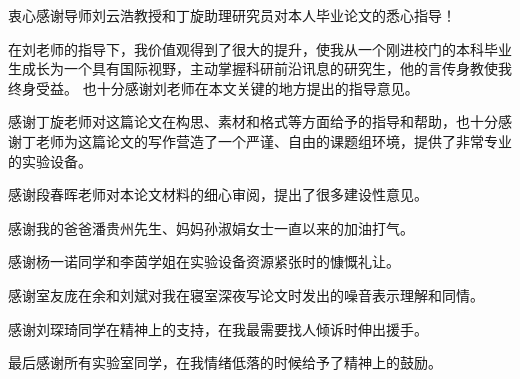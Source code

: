 
\begin{acknowledgements}
  衷心感谢导师刘云浩教授和丁旋助理研究员对本人毕业论文的悉心指导！
  
  在刘老师的指导下，我价值观得到了很大的提升，使我从一个刚进校门的本科毕业生成长为一个具有国际视野，主动掌握科研前沿讯息的研究生，他的言传身教使我终身受益。
  也十分感谢刘老师在本文关键的地方提出的指导意见。
  
  感谢丁旋老师对这篇论文在构思、素材和格式等方面给予的指导和帮助，也十分感谢丁老师为这篇论文的写作营造了一个严谨、自由的课题组环境，提供了非常专业的实验设备。

  感谢段春晖老师对本论文材料的细心审阅，提出了很多建设性意见。
  
  感谢我的爸爸潘贵州先生、妈妈孙淑娟女士一直以来的加油打气。
  
  感谢杨一诺同学和李茵学姐在实验设备资源紧张时的慷慨礼让。
  
  感谢室友庞在余和刘斌对我在寝室深夜写论文时发出的噪音表示理解和同情。

  感谢刘琛琦同学在精神上的支持，在我最需要找人倾诉时伸出援手。

  最后感谢所有实验室同学，在我情绪低落的时候给予了精神上的鼓励。
\end{acknowledgements}
